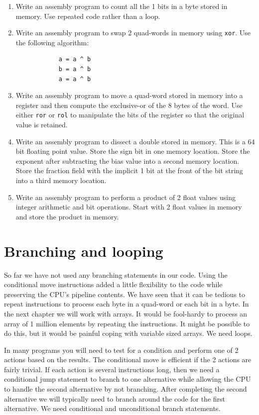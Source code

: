 \documentclass[11pt,b5paper]{book}
\begin{document}
\begin{enumerate}
\item Write an assembly program to count all the 1 bits in a byte stored in
memory.  Use repeated code rather than a loop.

\item Write an assembly program to swap 2 quad-words in memory using
{\tt xor}.  Use the following algorithm:
\begin{verbatim}
            a = a ^ b
            b = a ^ b
            a = a ^ b
\end{verbatim}

\item Write an assembly program to move a quad-word stored in memory into a register and then compute the exclusive-or of the
8 bytes of the word.
Use either {\tt ror} or {\tt rol} to manipulate the bits of the register so that the original value is retained.

\item Write an assembly program to dissect a double stored in memory.
This is a 64 bit floating point value.
Store the sign bit in one memory location.
Store the exponent after subtracting the bias value into a second memory location.
Store the fraction field with the implicit 1 bit at the front of the bit string into a third memory location.

\item Write an assembly program to perform a product of 2 float values using integer arithmetic and bit operations.
Start with 2 float values in memory and store the product in memory.

\end{enumerate}

\chapter{Branching and looping}

So far we have not used any branching statements in our code.
Using the conditional move instructions added a little flexibility to the code while preserving the CPU's pipeline contents.
We have seen that it can be tedious to repeat instructions to process each byte in a quad-word or each bit in a byte.
In the next chapter we will work with arrays.
It would be fool-hardy to process an array of 1 million elements by repeating the instructions.
It might be possible to do this, but it would be painful coping with variable sized arrays.
We need loops.

In many programs you will need to test for a condition and perform one of 2 actions based on the results.
The conditional move is efficient if the 2 actions are fairly trivial.
If each action is several instructions long, then we need a conditional jump statement to branch to one alternative while allowing 
the CPU to handle the second alternative by not branching.
After completing the second alternative we will typically need to branch around the code for the first alternative.
We need conditional and unconditional branch statements.
\end{document}
